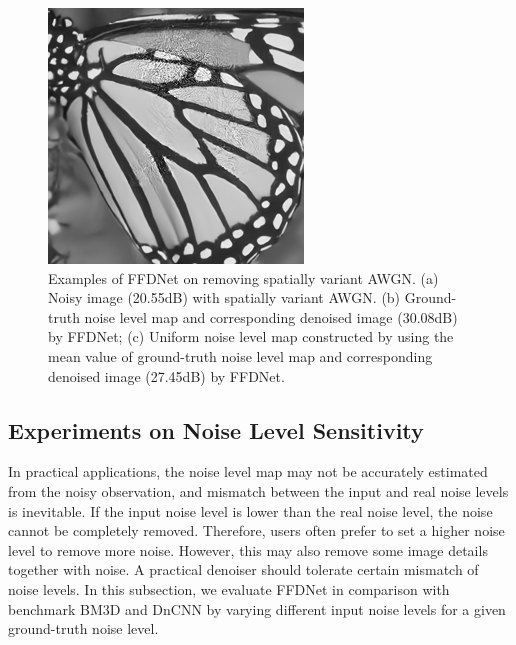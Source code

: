 \documentclass[journal]{IEEEtran}
\begin{document}
\begin{figure}[!htbp]
{\begin{minipage}[c]{0.15\textwidth}
  \includegraphics[width=.8\textwidth]{buterfly_denoised11.png}
\end{minipage}%
}
\caption{Examples of FFDNet on removing spatially variant AWGN. (a) Noisy image (20.55dB) with spatially variant AWGN. (b) Ground-truth noise level map and corresponding denoised image (30.08dB) by FFDNet; (c) Uniform noise level map constructed by using the mean value of ground-truth noise level map and corresponding denoised image (27.45dB) by FFDNet.}
\label{fig_sv1}
\end{figure}






\subsection{Experiments on Noise Level Sensitivity}

In practical applications, the noise level map may not be accurately estimated from the noisy observation, and mismatch between the input and real noise levels is inevitable. If the input noise level is lower than the real noise level, the noise cannot be completely removed. Therefore, users often prefer to set a higher noise level to remove more noise. However, this may also remove some image details together with noise. A practical denoiser should tolerate certain mismatch of noise levels. In this subsection, we evaluate FFDNet in comparison with benchmark BM3D and DnCNN by varying different input noise levels for a given ground-truth noise level.
\end{document}
